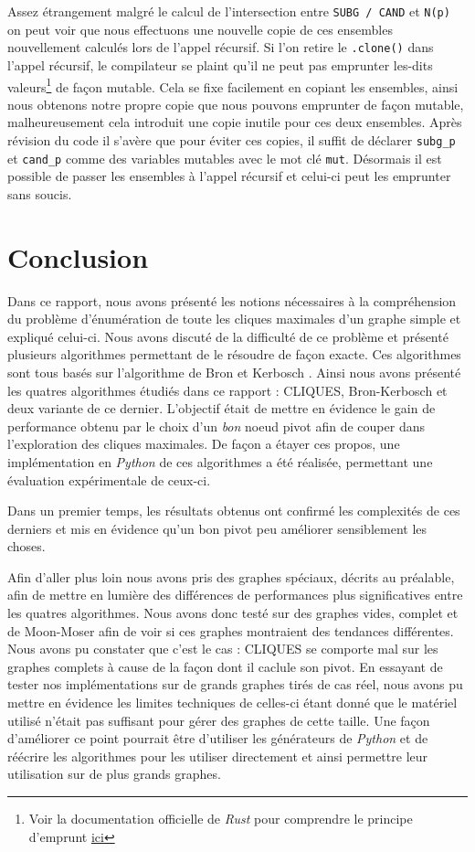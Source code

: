 \documentclass[12pt,a4paper]{article}
\begin{document}
Assez étrangement malgré le calcul de l'intersection entre \texttt{SUBG / CAND} et \texttt{N(p)} on peut voir que nous effectuons une nouvelle copie de ces ensembles nouvellement calculés lors de l'appel récursif. Si l'on retire le \texttt{.clone()} dans l'appel récursif, le compilateur se plaint qu'il ne peut pas emprunter les-dits valeurs\footnote{Voir la documentation officielle de \emph{Rust} pour comprendre le principe d'emprunt \href{https://doc.rust-lang.org/stable/book/ch04-00-understanding-ownership.html}{ici}} de façon mutable. Cela se fixe facilement en copiant les ensembles, ainsi nous obtenons notre propre copie que nous pouvons emprunter de façon mutable, malheureusement cela introduit une copie inutile pour ces deux ensembles.
Après révision du code il s'avère que pour éviter ces copies, il suffit de déclarer \texttt{subg\_p} et \texttt{cand\_p} comme des variables mutables avec le mot clé \texttt{mut}. Désormais il est possible de passer les ensembles à l'appel récursif et celui-ci peut les emprunter sans soucis.

\newpage
\section{Conclusion}

Dans ce rapport, nous avons présenté les notions nécessaires à la compréhension du problème d'énumération de toute les cliques maximales d'un graphe simple et expliqué celui-ci. Nous avons discuté de la difficulté de ce problème et présenté plusieurs algorithmes permettant de le résoudre de façon exacte. Ces algorithmes sont tous basés sur l'algorithme de Bron et Kerbosch \cite{bron1973algorithm}. Ainsi nous avons présenté les quatres algorithmes étudiés dans ce rapport : CLIQUES, Bron-Kerbosch et deux variante de ce dernier. L'objectif était de mettre en évidence le gain de performance obtenu par le choix d'un \emph{bon} noeud pivot afin de couper dans l'exploration des cliques maximales. De façon a étayer ces propos, une implémentation en \emph{Python} de ces algorithmes a été réalisée, permettant une évaluation expérimentale de ceux-ci.

Dans un premier temps, les résultats obtenus ont confirmé les complexités de ces derniers et mis en évidence qu'un bon pivot peu améliorer sensiblement les choses.

Afin d'aller plus loin nous avons pris des graphes spéciaux, décrits au préalable, afin de mettre en lumière des différences de performances plus significatives entre les quatres algorithmes. Nous avons donc testé sur des graphes vides, complet et de Moon-Moser afin de voir si ces graphes montraient des tendances différentes. Nous avons pu constater que c'est le cas : CLIQUES se comporte mal sur les graphes complets à cause de la façon dont il caclule son pivot. En essayant de tester nos implémentations sur de grands graphes tirés de cas réel, nous avons pu mettre en évidence les limites techniques de celles-ci étant donné que le matériel utilisé n'était pas suffisant pour gérer des graphes de cette taille. Une façon d'améliorer ce point pourrait être d'utiliser les générateurs de \emph{Python} et de réécrire les algorithmes pour les utiliser directement et ainsi permettre leur utilisation sur de plus grands graphes.
\end{document}
